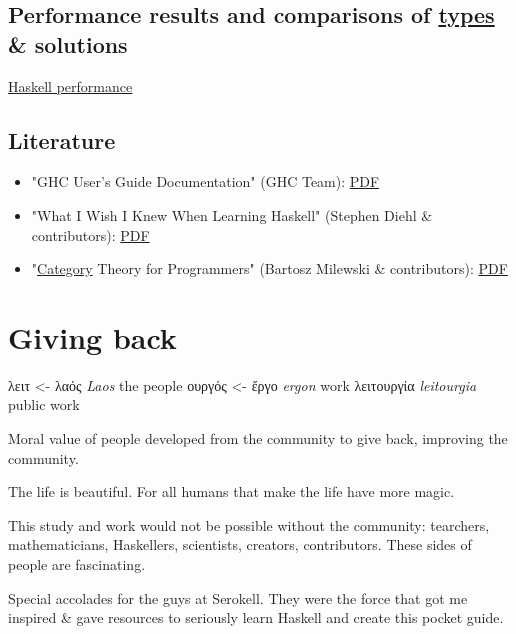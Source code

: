 \documentclass[a4paper,14pt,oneside]{book}
\begin{document}
\chapter{Performance results and comparisons of \hyperref[orgd1c0201]{types} \& solutions}
\label{sec:org0540d0e}
\href{https://github.com/haskell-perf}{Haskell performance}

\chapter{Literature}
\label{sec:orgaa6ba25}

\begin{itemize}
\item "GHC User’s Guide Documentation" (GHC Team): \href{https://downloads.haskell.org/\~ghc/latest/docs/users\_guide.pdf}{PDF}
\item "What I Wish I Knew When Learning Haskell" (Stephen Diehl \& contributors): \href{http://dev.stephendiehl.com/hask/tutorial.pdf}{PDF}
\item "\hyperref[org78b3e97]{Category} Theory for Programmers" (Bartosz Milewski \& contributors): \href{https://s3.amazonaws.com/milewski-ctfp-pdf/category-theory-for-programmers.pdf}{PDF}
\end{itemize}

\part{Giving back}
\label{sec:org471314f}

\textgreek{λειτ}       <- \textgreek{λαός}  \emph{Laos}       the people
    \textgreek{ουργός} <- \textgreek{ἔργο}  \emph{ergon}             work
\textgreek{λειτουργία}          \emph{leitourgia} public work

Moral value of people developed from the community to give back, improving the community.

The life is beautiful.
For all humans that make the life have more magic.

This study and work would not be possible without the community: tearchers, mathematicians, Haskellers, scientists, creators, contributors. These sides of people are fascinating.


Special accolades for the guys at Serokell. They were the force that got me inspired \& gave resources to seriously learn Haskell and create this pocket guide.
\end{document}
